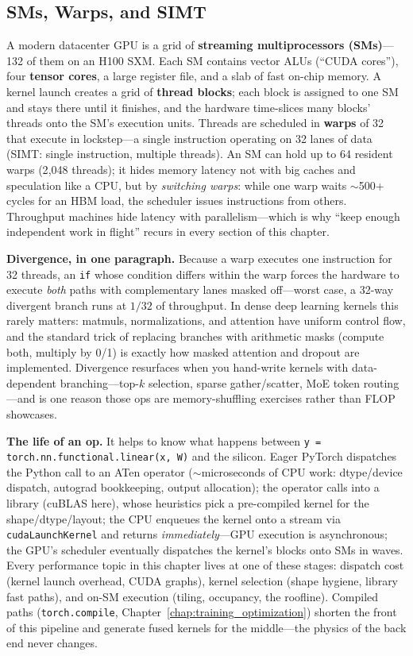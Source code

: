 \subsection{SMs, Warps, and SIMT}

A modern datacenter GPU is a grid of \textbf{streaming multiprocessors (SMs)}---132 of them on an H100 SXM. Each SM contains vector ALUs (``CUDA cores''), four \textbf{tensor cores}, a large register file, and a slab of fast on-chip memory. A kernel launch creates a grid of \textbf{thread blocks}; each block is assigned to one SM and stays there until it finishes, and the hardware time-slices many blocks' threads onto the SM's execution units. Threads are scheduled in \textbf{warps} of 32 that execute in lockstep---a single instruction operating on 32 lanes of data (SIMT: single instruction, multiple threads). An SM can hold up to 64 resident warps (2{,}048 threads); it hides memory latency not with big caches and speculation like a CPU, but by \textit{switching warps}: while one warp waits $\sim$500+ cycles for an HBM load, the scheduler issues instructions from others. Throughput machines hide latency with parallelism---which is why ``keep enough independent work in flight'' recurs in every section of this chapter.

\textbf{Divergence, in one paragraph.} Because a warp executes one instruction for 32 threads, an \texttt{if} whose condition differs within the warp forces the hardware to execute \textit{both} paths with complementary lanes masked off---worst case, a 32-way divergent branch runs at $1/32$ of throughput. In dense deep learning kernels this rarely matters: matmuls, normalizations, and attention have uniform control flow, and the standard trick of replacing branches with arithmetic masks (compute both, multiply by 0/1) is exactly how masked attention and dropout are implemented. Divergence resurfaces when you hand-write kernels with data-dependent branching---top-$k$ selection, sparse gather/scatter, MoE token routing---and is one reason those ops are memory-shuffling exercises rather than FLOP showcases.

\textbf{The life of an op.} It helps to know what happens between \texttt{y = torch.nn.functional.linear(x, W)} and the silicon. Eager PyTorch dispatches the Python call to an ATen operator ($\sim$microseconds of CPU work: dtype/device dispatch, autograd bookkeeping, output allocation); the operator calls into a library (cuBLAS here), whose heuristics pick a pre-compiled kernel for the shape/dtype/layout; the CPU enqueues the kernel onto a stream via \texttt{cudaLaunchKernel} and returns \textit{immediately}---GPU execution is asynchronous; the GPU's scheduler eventually dispatches the kernel's blocks onto SMs in waves. Every performance topic in this chapter lives at one of these stages: dispatch cost (kernel launch overhead, CUDA graphs), kernel selection (shape hygiene, library fast paths), and on-SM execution (tiling, occupancy, the roofline). Compiled paths (\texttt{torch.compile}, Chapter~\ref{chap:training_optimization}) shorten the front of this pipeline and generate fused kernels for the middle---the physics of the back end never changes.

